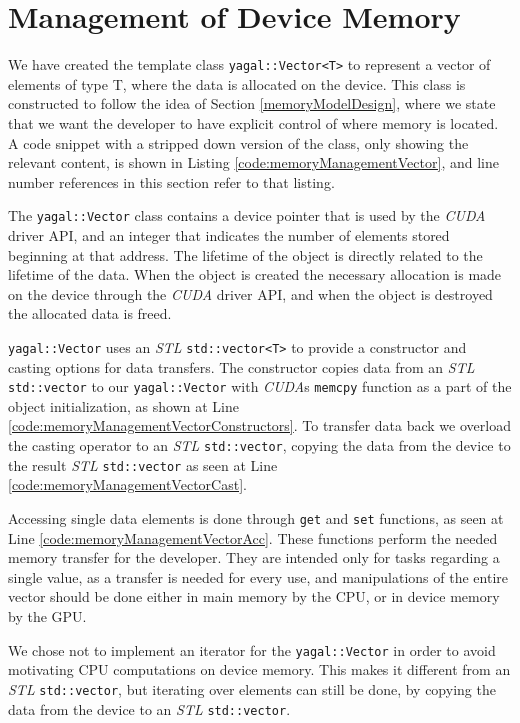 \section{Management of Device Memory}
We have created the template class \texttt{yagal::Vector<T>} to represent a vector of elements of type T, where the data is allocated on the device. This class is constructed to follow the idea of Section \ref{memoryModelDesign}, where we state that we want the developer to have explicit control of where memory is located. A code snippet with a stripped down version of the class, only showing the relevant content, is shown in Listing \ref{code:memoryManagementVector}, and line number references in this section refer to that listing.

The \texttt{yagal::Vector} class contains a device pointer that is used by the \textit{CUDA} driver API, and an integer that indicates the number of elements stored beginning at that address. The lifetime of the object is directly related to the lifetime of the data. When the object is created the necessary allocation is made on the device through the \textit{CUDA} driver API, and when the object is destroyed the allocated data is freed.

\texttt{yagal::Vector} uses an \textit{STL} \texttt{std::vector<T>} to provide a constructor and casting options for data transfers. The constructor copies data from an \textit{STL} \texttt{std::vector} to our \texttt{yagal::Vector} with \textit{CUDA}s \texttt{memcpy} function as a part of the object initialization, as shown at Line \ref{code:memoryManagementVectorConstructors}. To transfer data back we overload the casting operator to an \textit{STL} \texttt{std::vector}, copying the data from the device to the result \textit{STL} \texttt{std::vector} as seen at Line \ref{code:memoryManagementVectorCast}.

Accessing single data elements is done through \texttt{get} and \texttt{set} functions, as seen at Line \ref{code:memoryManagementVectorAcc}. These functions perform the needed memory transfer for the developer. They are intended only for tasks regarding a single value, as a transfer is needed for every use, and manipulations of the entire vector should be done either in main memory by the CPU, or in device memory by the GPU.

We chose not to implement an iterator for the \texttt{yagal::Vector} in order to avoid motivating CPU computations on device memory. This makes it different from an \textit{STL} \texttt{std::vector}, but iterating over elements can still be done, by copying the data from the device to an \textit{STL} \texttt{std::vector}.

